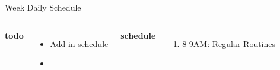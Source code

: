 \documentclass[serif, mathserif, final]{beamer}
\begin{document}
\begin{frame}
\begin{columns}
      \begin{block}{Week Daily Schedule} 
        \begin{columns} 

          \textbf{\small todo} \\ 
          \begin{itemize}
            \tiny \item \tiny Add in schedule
          \item \tiny 
          \end{itemize} 
          \textbf{\small schedule} \\
          \begin{enumerate} 
            \tiny \item \tiny 8-9AM: Regular Routines 
          \end{enumerate} 
        \end{columns} 
      \end{block}



\end{columns}




\end{frame}
\end{document}
